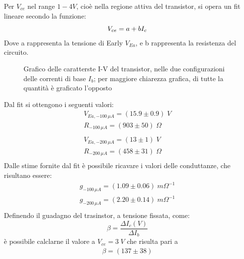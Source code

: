 \documentclass{article}
\begin{document}
Per $V_{ce}$ nel range $1-4 V$, cioè nella regione attiva del transistor, si opera un fit lineare secondo la funzione:
\begin{equation}
    V_{ce} = a + b I_c\\
\end{equation}
Dove a rappresenta la tensione di Early $V_{Ea}$, e b rappresenta la resistenza del circuito.\\
\begin{figure}[H]
    \begin{center}
        \scalebox{0.7}{}
        \caption{\centering\label{fig:multigraph}Grafico delle caratterste I-V del transistor, nelle due configurazioni delle correnti di base $I_b$; per maggiore chiarezza grafica, di tutte la quantità è graficato l'opposto}
    \end{center}
\end{figure}
Dal fit si ottengono i seguenti valori:
\begin{equation}
    \begin{aligned}
        V_{Ea,-100 \,\mu A}=(15.9\pm 0.9) \;V  \\
        R_{-100 \,\mu A}=(903 \pm 50) \;\Omega \\
        \\
        V_{Ea,-200 \,\mu A}=(13\pm 1) \;V      \\
        R_{-200 \,\mu A}=(458 \pm 31) \;\Omega \\
    \end{aligned}
\end{equation}
Dalle stime fornite dal fit è possibile ricavare i valori delle conduttanze, che risultano essere:
\begin{equation}
    \begin{aligned}
        g_{-100 \,\mu A}=(1.09 \pm 0.06) \;m\Omega^{-1} \\
        g_{-200 \,\mu A}=(2.20 \pm 0.14) \;m\Omega^{-1} \\
    \end{aligned}
\end{equation}
Definendo il guadagno del trasinstor, a tensione fissata, come:
\begin{equation}
    \beta= \frac{\Delta I_c(V)}{\Delta I_b}
\end{equation}
è possibile calclarne il valore a $V_{ce}=3 \;V$ che risulta pari a
\begin{equation}
    \begin{aligned}
        \beta=(137\pm38)
    \end{aligned}
\end{equation}
\end{document}
